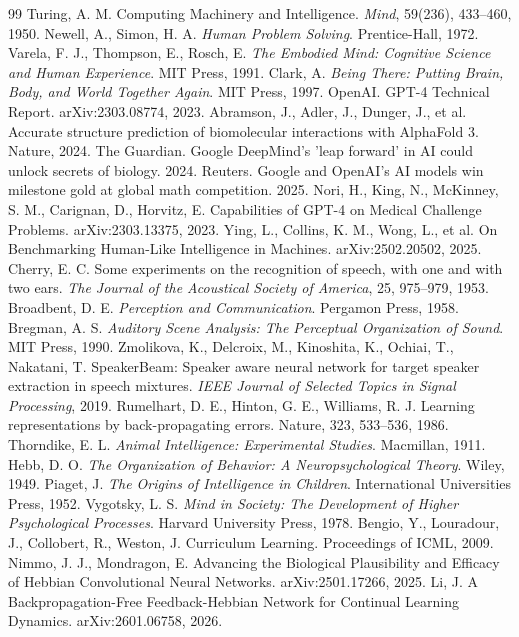 \documentclass[UTF8,zihao=-4,a4paper]{ctexart}
\begin{document}
\newpage

\begin{thebibliography}{99}
 Turing, A. M. Computing Machinery and Intelligence. \textit{Mind}, 59(236), 433--460, 1950.
 Newell, A., Simon, H. A. \textit{Human Problem Solving}. Prentice-Hall, 1972.
 Varela, F. J., Thompson, E., Rosch, E. \textit{The Embodied Mind: Cognitive Science and Human Experience}. MIT Press, 1991.
 Clark, A. \textit{Being There: Putting Brain, Body, and World Together Again}. MIT Press, 1997.
 OpenAI. GPT-4 Technical Report. arXiv:2303.08774, 2023.
 Abramson, J., Adler, J., Dunger, J., et al. Accurate structure prediction of biomolecular interactions with AlphaFold 3. Nature, 2024.
 The Guardian. Google DeepMind's 'leap forward' in AI could unlock secrets of biology. 2024.
 Reuters. Google and OpenAI's AI models win milestone gold at global math competition. 2025.
 Nori, H., King, N., McKinney, S. M., Carignan, D., Horvitz, E. Capabilities of GPT-4 on Medical Challenge Problems. arXiv:2303.13375, 2023.
 Ying, L., Collins, K. M., Wong, L., et al. On Benchmarking Human-Like Intelligence in Machines. arXiv:2502.20502, 2025.
 Cherry, E. C. Some experiments on the recognition of speech, with one and with two ears. \textit{The Journal of the Acoustical Society of America}, 25, 975--979, 1953.
 Broadbent, D. E. \textit{Perception and Communication}. Pergamon Press, 1958.
 Bregman, A. S. \textit{Auditory Scene Analysis: The Perceptual Organization of Sound}. MIT Press, 1990.
 Zmolikova, K., Delcroix, M., Kinoshita, K., Ochiai, T., Nakatani, T. SpeakerBeam: Speaker aware neural network for target speaker extraction in speech mixtures. \textit{IEEE Journal of Selected Topics in Signal Processing}, 2019.
 Rumelhart, D. E., Hinton, G. E., Williams, R. J. Learning representations by back-propagating errors. Nature, 323, 533--536, 1986.
 Thorndike, E. L. \textit{Animal Intelligence: Experimental Studies}. Macmillan, 1911.
 Hebb, D. O. \textit{The Organization of Behavior: A Neuropsychological Theory}. Wiley, 1949.
 Piaget, J. \textit{The Origins of Intelligence in Children}. International Universities Press, 1952.
 Vygotsky, L. S. \textit{Mind in Society: The Development of Higher Psychological Processes}. Harvard University Press, 1978.
 Bengio, Y., Louradour, J., Collobert, R., Weston, J. Curriculum Learning. Proceedings of ICML, 2009.
 Nimmo, J. J., Mondragon, E. Advancing the Biological Plausibility and Efficacy of Hebbian Convolutional Neural Networks. arXiv:2501.17266, 2025.
 Li, J. A Backpropagation-Free Feedback-Hebbian Network for Continual Learning Dynamics. arXiv:2601.06758, 2026.
\end{thebibliography}
\end{document}

